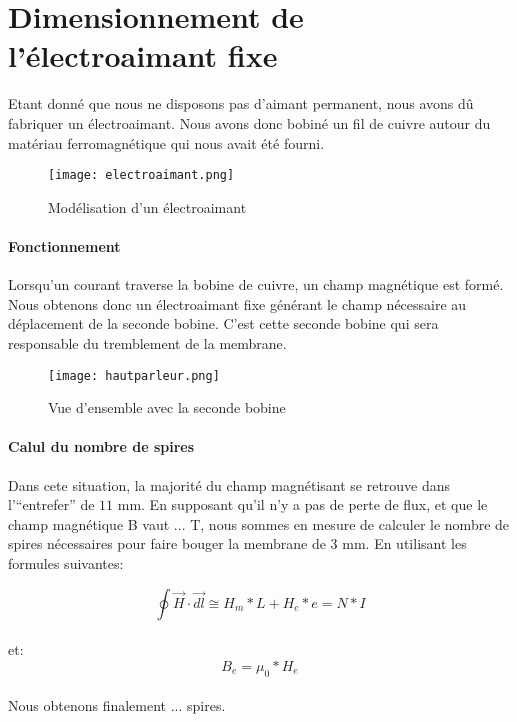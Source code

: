 \documentclass{article}
\begin{document}
\section{Dimensionnement de l'électroaimant fixe}

Etant donné que nous ne disposons pas d'aimant permanent, nous avons dû fabriquer un électroaimant. 
Nous avons donc bobiné un fil de cuivre autour du matériau ferromagnétique qui nous avait été fourni. 

\begin{figure}[h]
\centering
\texttt{[image: electroaimant.png]}
\caption{Modélisation d'un électroaimant}
\label{modélisation de l'électroaimant}
\end{figure}

\paragraph{Fonctionnement}
Lorsqu'un courant traverse la bobine de cuivre, un champ magnétique est formé.  Nous obtenons 
donc un électroaimant fixe générant le champ nécessaire au déplacement de la seconde bobine. 
C'est cette seconde bobine qui sera responsable du tremblement de la membrane.

\begin{figure}[h]
\centering
\texttt{[image: hautparleur.png]}
\caption{Vue d'ensemble avec la seconde bobine}
\label{Vue d'ensemble avec la seconde bobine}
\end{figure}

\paragraph{Calul du nombre de spires}
Dans cete situation, la majorité du champ magnétisant se retrouve dans l'"`entrefer"' de $11$ mm. En supposant qu'il n'y a pas de perte de flux, et que le champ magnétique B vaut  ... T, nous sommes en mesure de calculer le nombre de spires nécessaires pour faire bouger la membrane de $3$ mm. %
En utilisant les formules suivantes:

$$\oint \vec{H}\cdot\vec{dl}\cong H_m * L + H_e * e = N*I$$ \\
et:
$$B_e = \mu_0*H_e$$\\

Nous obtenons finalement ... spires.


\end{document}

